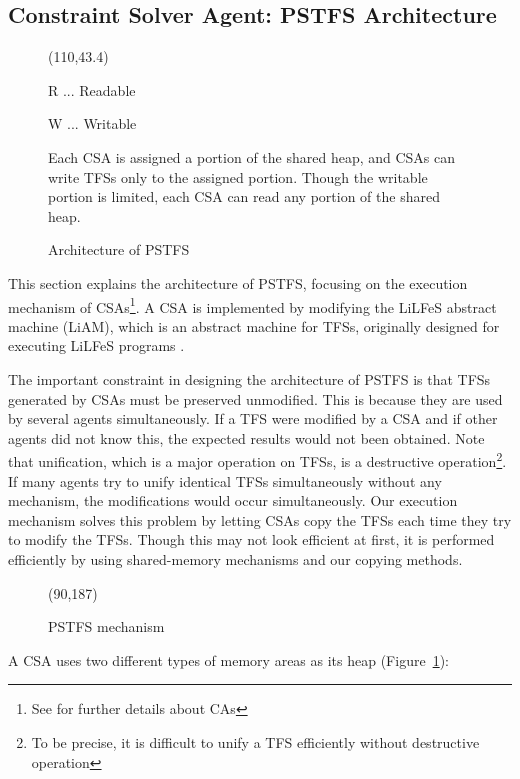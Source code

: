 \subsection{Constraint Solver Agent: PSTFS Architecture}
\begin{figure}[t]
{\small
\begin{center}
\atari(110,43.4)

R ... Readable

W ... Writable
\end{center}

Each CSA is assigned a portion of the shared heap, and CSAs can write
TFSs only to the assigned portion.  Though the writable portion is
limited, each CSA can read any portion of the shared heap.
\caption{Architecture of PSTFS}
\label{fig:sh5}
}
\end{figure}

  This section explains the architecture of PSTFS, focusing on the
execution mechanism of CSAs\footnote{See \cite{Taura97} for further
details about CAs}.  A CSA is implemented by modifying the LiLFeS
abstract machine (LiAM), which is an abstract machine for TFSs,
originally designed for executing LiLFeS programs \cite{Makino98}.

  The important constraint in designing the architecture of PSTFS is
that TFSs generated by CSAs must be preserved unmodified. This is
because they are used by several agents simultaneously. If a TFS were
modified by a CSA and if other agents did not know this, the expected
results would not been obtained. Note that unification, which is a
major operation on TFSs, is a destructive operation\footnote{To be
precise, it is difficult to unify a TFS efficiently without
destructive operation}.  If many agents try to unify identical TFSs
simultaneously without any mechanism, the modifications would occur
simultaneously.  Our execution mechanism solves this problem by
letting CSAs copy the TFSs each time they try to modify the
TFSs. Though this may not look efficient at first, it is performed
efficiently by using shared-memory mechanisms and our copying methods.

\begin{figure}[p]
\begin{center}
\atari(90,187)
\caption{PSTFS mechanism}
\label{fig:sh6}
\end{center}
\end{figure}

 A CSA uses two different types of memory areas as its heap (Figure~\ref{fig:sh5}):

